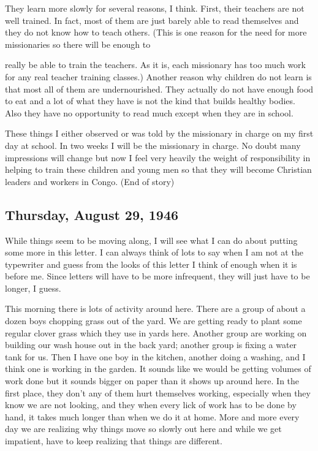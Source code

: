 \documentclass[
]{book}
\begin{document}
They learn more slowly for several reasons, I think. First, their teachers are not well trained. In fact, most of them are just barely able to read themselves and they do not know how to teach others. (This is one reason for the need for more missionaries so there will be enough to

really be able to train the teachers. As it is, each missionary has too much work for any real teacher training classes.) Another reason why children do not learn is that most all of them are undernourished. They actually do not have enough food to eat and a lot of what they have is not the kind that builds healthy bodies. Also they have no opportunity to read much except when they are in school.

These things I either observed or was told by the missionary in charge on my first day at school. In two weeks I will be the missionary in charge. No doubt many impressions will change but now I feel very heavily the weight of responsibility in helping to train these children and young men so that they will become Christian leaders and workers in Congo. (End of story)

\hypertarget{thursday-august-29-1946}{%
\subsection{Thursday, August 29, 1946}\label{thursday-august-29-1946}}

While things seem to be moving along, I will see what I can do about putting some more in this letter. I can always think of lots to say when I am not at the typewriter and guess from the looks of this letter I think of enough when it is before me. Since letters will have to be more infrequent, they will just have to be longer, I guess.

This morning there is lots of activity around here. There are a group of about a dozen boys chopping grass out of the yard. We are getting ready to plant some regular clover grass which they use in yards here. Another group are working on building our wash house out in the back yard; another group is fixing a water tank for us. Then I have one boy in the kitchen, another doing a washing, and I think one is working in the garden. It sounds like we would be getting volumes of work done but it sounds bigger on paper than it shows up around here. In the first place, they don't any of them hurt themselves working, especially when they know we are not looking, and they when every lick of work has to be done by hand, it takes much longer than when we do it at home. More and more every day we are realizing why things move so slowly out here and while we get impatient, have to keep realizing that things are different.
\end{document}
